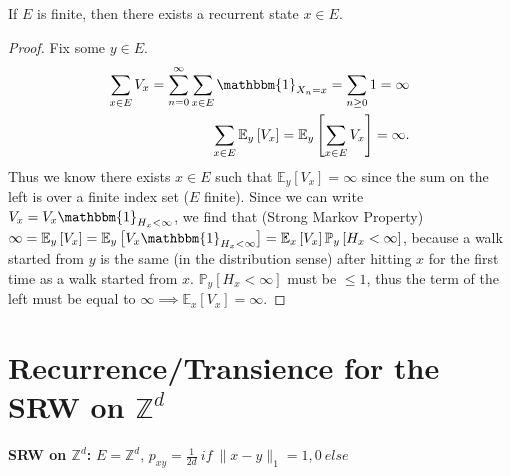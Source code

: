 \begin{prop}[]
	If $E$ is finite, then there exists a recurrent state $x \in E$.
\end{prop}
\begin{proof}
	Fix some $y \in E$.
	\begin{align}
		\sum_{x \in E}^{} V_x = \sum_{n=0}^{\infty} \sum_{x \in E}^{} \mathbbm{1}_{X_n =x} = \sum_{n\geq 0}^{} 1  = \infty \\
	\sum_{x \in E}^{} \mathbb{E}_{y} \left[ V_x \right] = \mathbb{E}_{y} \left[ \sum_{x \in E}^{} V_x \right] = \infty 
.	\end{align}
	Thus we know there exists $x \in E$ such that $\mathbb{E}_{y} \left[ V_x \right] = \infty$ since the sum on the left is over a finite index set ($E$ finite). Since we can write $V_x = V_x \mathbbm{1}_{H_x<\infty}$, we find that (Strong Markov Property) $\infty = \mathbb{E}_{y} \left[ V_x \right] = \mathbb{E}_{y} \left[ V_x \mathbbm{1}_{H_x<\infty}  \right] = \mathbb{E}_{x} \left[ V_x \right] \mathbb{P}_{y} \left[ H_x < \infty \right] $, because a walk started from $y$ is the same (in the distribution sense) after hitting $x$ for the first time as a walk started from $x$. $\mathbb{P}_{y} \left[ H_x < \infty \right]$ must be $ \leq 1 $, thus the term of the left must be equal to $\infty \implies \mathbb{E}_{x} \left[ V_x \right] = \infty$.
\end{proof}


\section{Recurrence/Transience for the SRW on $\mathbb{Z}^d$}
\textbf{SRW on $\mathbb{Z}^d$:} $E=\mathbb{Z}^d$, $p_{xy}=\frac{1}{2d}\ if\ \|x-y\|_1=1, 0\ else$ 

